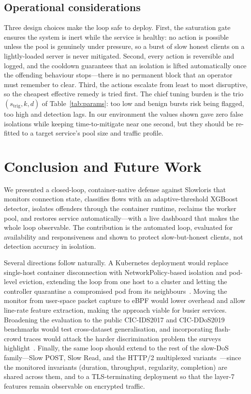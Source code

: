 \documentclass[conference]{IEEEtran}
\begin{document}
\subsection{Operational considerations}
Three design choices make the loop safe to deploy. First, the saturation gate
ensures the system is inert while the service is healthy: no action is possible
unless the pool is genuinely under pressure, so a burst of slow honest clients on a
lightly-loaded server is never mitigated. Second, every action is reversible and
logged, and the cooldown guarantees that an isolation is lifted automatically once
the offending behaviour stops---there is no permanent block that an operator must
remember to clear. Third, the actions escalate from least to most disruptive, so
the cheapest effective remedy is tried first. The chief tuning burden is the
trio $(s_{\text{trig}}, k, d)$ of Table~\ref{tab:params}: too low and benign
bursts risk being flagged, too high and detection lags. In our environment the
values shown gave zero false isolations while keeping time-to-mitigate near one
second, but they should be re-fitted to a target service's pool size and traffic
profile.

\section{Conclusion and Future Work}
We presented a closed-loop, container-native defense against Slowloris that
monitors connection state, classifies flows with an adaptive-threshold XGBoost
detector, isolates offenders through the container runtime, reclaims the worker
pool, and restores service automatically---with a live dashboard that makes the
whole loop observable. The contribution is the automated loop, evaluated for
availability and responsiveness and shown to protect slow-but-honest clients, not
detection accuracy in isolation.

Several directions follow naturally. A Kubernetes deployment would replace
single-host container disconnection with NetworkPolicy-based isolation and
pod-level eviction, extending the loop from one host to a cluster and letting the
controller quarantine a compromised pod from its neighbours~\cite{k8s_netpol}.
Moving the monitor from user-space packet capture to eBPF would lower overhead and
allow line-rate feature extraction, making the approach viable for busier services.
Broadening the evaluation to the public CIC-IDS2017 and
CIC-DDoS2019~\cite{sharafaldin2018cicids,sharafaldin2019ddos} benchmarks would test
cross-dataset generalisation, and incorporating flash-crowd traces would attack the
harder discrimination problem the surveys highlight~\cite{deressu2026survey}.
Finally, the same loop should extend to the rest of the slow-DoS family---Slow POST,
Slow Read, and the HTTP/2 multiplexed variants~\cite{praseed2020http2}---since the
monitored invariants (duration, throughput, regularity, completion) are shared
across them, and to a TLS-terminating deployment so that the layer-7 features remain
observable on encrypted traffic.
\end{document}
